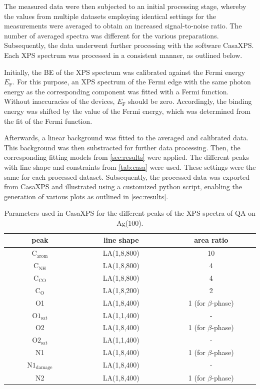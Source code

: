 The measured data were then subjected to an initial processing stage, whereby the values from multiple datasets employing identical settings for the measurements were averaged to obtain an increased signal-to-noise ratio. The number of averaged spectra was different for the various preparations. Subsequently, the data underwent further processing with the software CasaXPS.\autocite{CasaSoftwareLtd2022} Each XPS spectrum was processed in a consistent manner, as outlined below.

Initially, the \ac{BE} of the \ac{XPS} spectrum was calibrated against the Fermi energy $E_\mathrm{F}$. For this purpose, an \ac{XPS} spectrum of the Fermi edge with the same photon energy as the corresponding component was fitted with a Fermi function. Without inaccuracies of the devices, $E_\mathrm{F}$ should be zero. Accordingly, the binding energy was shifted by the value of the Fermi energy, which was determined from the fit of the Fermi function.

Afterwards, a linear background was fitted to the averaged and calibrated data. This background was then substracted for further data processing. Then, the corresponding fitting models from \autoref{sec:results} were applied. The different peaks with line shape and constraints from \autoref{tab:casa} were used. These settings were the same for each processed dataset. Subsequently, the processed data was exported from CasaXPS and illustrated using a customized python script, enabling the generation of various plots as outlined in \autoref{sec:results}.

\begin{table}[H]
	\centering
	\caption{Parameters used in CasaXPS\autocite{CasaSoftwareLtd2022} for the different peaks of the \ac{XPS} spectra of \ac{QA} on Ag(100).}
\begin{tabular}{@{}ccc@{}} \toprule
	~~~~~~peak~~~~~~ & ~~~~~~line shape~~~~~~ & ~~~~~~area ratio~~~~~~ \\
	\midrule
	$\mathrm{C_{arom}}$ & LA(1,8,800) & 10 \\
	$\mathrm{C_{NH}}$ & LA(1,8,800) & 4 \\
	$\mathrm{C_{CO}}$ & LA(1,8,800) & 4 \\
	$\mathrm{C_{O}}$ & LA(1,8,200) & 2 \\
	\midrule
	O1 & LA(1,8,400) & 1 (for $\beta$-phase) \\
	$\mathrm{O1_{sat}}$ & LA(1,1,400) & - \\
	O2 & LA(1,8,400) & 1 (for $\beta$-phase) \\
	$\mathrm{O2_{sat}}$  & LA(1,1,400) & - \\
	\midrule
	N1 & LA(1,8,400) & 1 (for $\beta$-phase) \\
	$\mathrm{N1_{damage}}$  & LA(1,8,400) & - \\
	N2 & LA(1,8,400) & 1 (for $\beta$-phase) \\
	\bottomrule
\end{tabular}
	\label{tab:casa}
\end{table}

